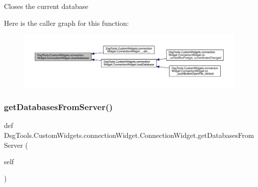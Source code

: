 \begin{DoxyVerb}Closes the current database
\end{DoxyVerb}
 Here is the caller graph for this function\+:
\nopagebreak
\begin{figure}[H]
\begin{center}
\leavevmode
\includegraphics[width=350pt]{class_dsg_tools_1_1_custom_widgets_1_1connection_widget_1_1_connection_widget_a5db934d202ff7387e420a05fbf1508ed_icgraph}
\end{center}
\end{figure}
\mbox{\label{class_dsg_tools_1_1_custom_widgets_1_1connection_widget_1_1_connection_widget_ae789614935c50c34eb9d3df90859938e}} 
\subsubsection{\texorpdfstring{get\+Databases\+From\+Server()}{getDatabasesFromServer()}}
{\footnotesize\ttfamily def Dsg\+Tools.\+Custom\+Widgets.\+connection\+Widget.\+Connection\+Widget.\+get\+Databases\+From\+Server (\begin{DoxyParamCaption}\item[{}]{self }\end{DoxyParamCaption})}

